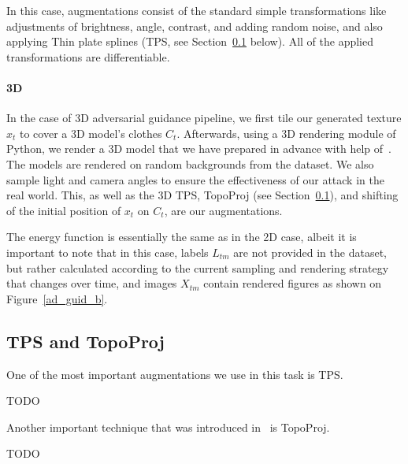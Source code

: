 In this case, augmentations consist of the standard simple transformations like adjustments of brightness, angle, contrast, and adding random noise, and also applying Thin plate splines (TPS, see Section~\ref{sec:tps} below).
All of the applied transformations are differentiable. 

\paragraph{3D} 
In the case of 3D adversarial guidance pipeline, we first tile our generated texture $x_t$ to cover a 3D model's clothes $C_t$.
Afterwards, using a 3D rendering module of Python, we render a 3D model that we have prepared in advance with help of~\cite{zh_3d}.
The models are rendered on random backgrounds from the dataset.
We also sample light and camera angles to ensure the effectiveness of our attack in the real world. 
This, as well as the 3D TPS, TopoProj (see Section~\ref{sec:tps}),  and shifting of the initial position of $x_t$ on $C_t$, are our augmentations.

The energy function is essentially the same as in the 2D case, albeit it is important to note that in this case, labels $L_{tm}$ are not provided in the dataset, but rather calculated according to the current sampling and rendering strategy that changes over time, and images $X_{tm}$ contain rendered figures as shown on Figure~\ref{ad_guid_b}.

\subsection{TPS and TopoProj}\label{sec:tps}

One of the most important augmentations we use in this task is TPS. 

 TODO 

Another important technique that was introduced in~\cite{zh_3d} is TopoProj.

 TODO 




